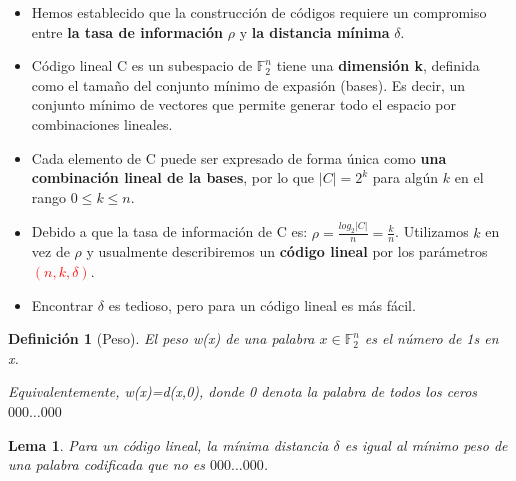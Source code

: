 \documentclass{beamer}
\theoremstyle{plain}
\newtheorem{definicion} [Definicion]{Definición}
\newtheorem{lema} [theorem] {Lema}
\theoremstyle{example}
\theoremstyle{example}
\begin{document}
\begin{frame}  \footnotesize  
\begin{itemize}

 \item  Hemos establecido que la construcción de códigos requiere un compromiso entre \textbf{la tasa de información} $\rho$ y \textbf{la distancia mínima} $\delta$. 
 
\item Código lineal C es un subespacio de $\mathbb{F}^n_2$ tiene una \textbf{dimensión k}, definida como el tamaño del conjunto mínimo de expasión (bases). Es decir, un conjunto mínimo de vectores que permite generar todo el espacio por combinaciones lineales.

\item Cada elemento de C puede ser expresado de forma única como \textbf{una combinación lineal de la bases}, por lo que $|C| = 2^k$ para algún $k$ en el rango $0 \leq k \leq n$. 

\item Debido a que la tasa de información de C es: $\rho = \frac{log_2|C|}{n} = \frac{k}{n}$. Utilizamos $k$ en vez de $\rho$ y usualmente describiremos un \textbf{código lineal} por los parámetros \textcolor{red}{\textbf{$(n, k, \delta)$}}. 

\item Encontrar $\delta$ es tedioso, pero para un código lineal es más fácil.

\end{itemize}
\begin{definicion}[Peso]
El peso w(x) de una palabra $x \in \mathbb{F}_2^n$ es el número de 1s en x. 

Equivalentemente, w(x)=d(x,0), donde 0 denota la palabra de todos los ceros $000 \ldots 000$
\end{definicion}


\begin{lema}
Para un código lineal, la mínima distancia $\delta$ es igual al mínimo peso de una palabra codificada que no es $000 \ldots 000$.
\end{lema}

 \end{frame} 
\end{document}
